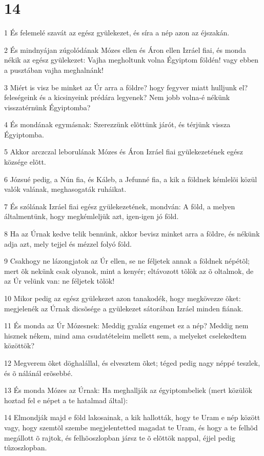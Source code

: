 \chapter{14}

\par 1 És felemelé szavát az egész gyülekezet, és síra a nép azon az éjszakán.
\par 2 És mindnyájan zúgolódának Mózes ellen és Áron ellen Izráel fiai, és monda nékik az egész gyülekezet: Vajha megholtunk volna Égyiptom földén! vagy ebben a pusztában vajha meghalnánk!
\par 3 Miért is visz be minket az Úr arra a földre? hogy fegyver miatt hulljunk el? feleségeink és a kicsinyeink prédára legyenek? Nem jobb volna-é nékünk visszatérnünk Égyiptomba?
\par 4 És mondának egymásnak: Szerezzünk elõttünk járót, és térjünk vissza Égyiptomba.
\par 5 Akkor arczczal leborulának Mózes és Áron Izráel fiai gyülekezetének egész községe elõtt.
\par 6 Józsué pedig, a Nún fia, és Káleb, a Jefunné fia, a kik a földnek kémlelõi közül valók valának, meghasogaták ruháikat.
\par 7 És szólának Izráel fiai egész gyülekezetének, mondván: A föld, a melyen általmentünk, hogy megkémleljük azt, igen-igen jó föld.
\par 8 Ha az Úrnak kedve telik bennünk, akkor bevisz minket arra a földre, és nékünk adja azt, mely tejjel és mézzel folyó föld.
\par 9 Csakhogy ne lázongjatok az Úr ellen, se ne féljetek annak a földnek népétõl; mert õk nekünk csak olyanok, mint a kenyér; eltávozott tõlök az õ oltalmok, de az Úr velünk van: ne féljetek tõlök!
\par 10 Mikor pedig az egész gyülekezet azon tanakodék, hogy megkövezze õket: megjelenék az Úrnak dicsõsége a gyülekezet sátorában Izráel minden fiának.
\par 11 És monda az Úr Mózesnek: Meddig gyaláz engemet ez a nép? Meddig nem hisznek nékem, mind ama csudatételeim mellett sem, a melyeket cselekedtem közöttök?
\par 12 Megverem õket döghalállal, és elvesztem õket; téged pedig nagy néppé teszlek, és õ nálánál erõsebbé.
\par 13 És monda Mózes az Úrnak: Ha meghallják az égyiptombeliek (mert közülök hoztad fel e népet a te hatalmad által):
\par 14 Elmondják majd e föld lakosainak, a kik hallották, hogy te Uram e nép között vagy, hogy szemtõl szembe megjelentetted magadat te Uram, és hogy a te felhõd megállott õ rajtok, és felhõoszlopban jársz te õ elõttök nappal, éjjel pedig tûzoszlopban.
